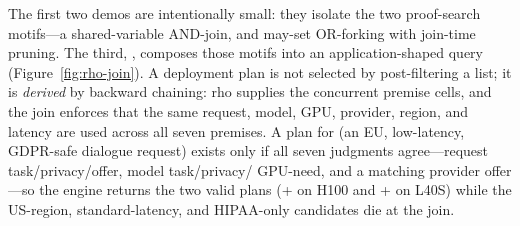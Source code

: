 The first two demos are intentionally small: they isolate the two proof-search
motifs---a shared-variable AND-join, and may-set OR-forking with join-time pruning.
The third, , composes those motifs into an
application-shaped query (Figure~\ref{fig:rho-join}).  A deployment plan is not
selected by post-filtering a list; it is \emph{derived} by backward chaining: rho
supplies the concurrent premise cells, and the join enforces that the same request,
model, GPU, provider, region, and latency are used across all seven premises.  A
plan for  (an EU, low-latency, GDPR-safe dialogue request) exists only
if all seven judgments agree---request task/privacy/offer, model task/privacy/%
GPU-need, and a matching provider offer---so the engine returns the two valid plans
(+ on H100 and + on L40S) while
the US-region, standard-latency, and HIPAA-only candidates die at the join.

